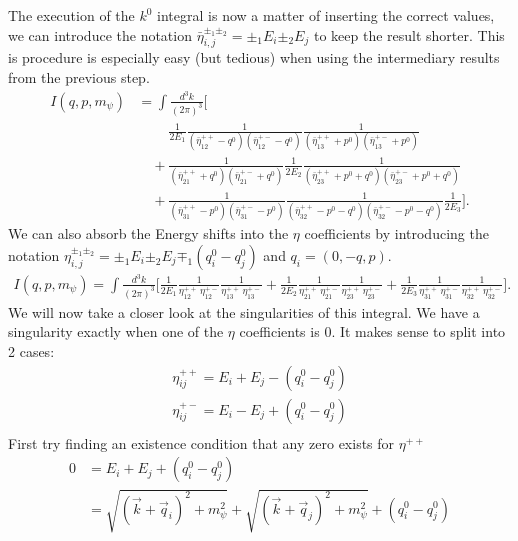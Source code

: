 The execution of the $k^0$ integral is now a matter of inserting the correct values, we can introduce the notation $\bar{\eta}^{\pm_1\pm_2}_{i,j} =\pm_1E_i \pm_2E_j$ to keep the result shorter. This is procedure is especially easy (but tedious) when using the intermediary results from the previous step.
\begin{align*}
    I(q,p,m_\psi)
    &= \int\frac{d^3k}{(2\pi)^3}
    \Bigg[\\
    &\quad \phantom{+} \frac{1}{2E_1}
    \frac{1}{(\bar{\eta}^{++}_{12} - q^0)(\bar{\eta}^{+-}_{12} - q^0)}
    \frac{1}{(\bar{\eta}^{++}_{13} + p^0)(\bar{\eta}^{+-}_{13} + p^0)} \\
    &\quad +
    \frac{1}{(\bar{\eta}^{++}_{21} + q^0)(\bar{\eta}^{+-}_{21} + q^0)}
    \frac{1}{2E_2}
    \frac{1}{(\bar{\eta}^{++}_{23} + p^0 + q^0)(\bar{\eta}^{+-}_{23} + p^0 + q^0)} \\
    &\quad +
    \frac{1}{(\bar{\eta}^{++}_{31} - p^0)(\bar{\eta}^{+-}_{31} - p^0)}
    \frac{1}{(\bar{\eta}^{++}_{32} - p^0 - q^0)(\bar{\eta}^{+-}_{32} - p^0 - q^0)}
    \frac{1}{2E_3}
    \Bigg].
\end{align*}
We can also absorb the Energy shifts into the $\eta$ coefficients by introducing the notation $\eta^{\pm_1\pm_2}_{i,j} =\pm_1E_i \pm_2E_j \mp_1 (q^0_i-q^0_j)$ and $q_i = (0,-q, p)$.
\begin{align*}
    I(q,p,m_\psi)
    = \int\frac{d^3k}{(2\pi)^3}
    \Bigg[
    \frac{1}{2E_1}
    \frac{1}{\eta^{++}_{12}\,\eta^{+-}_{12}}
    \frac{1}{\eta^{++}_{13}\,\eta^{+-}_{13}}
     +
    \frac{1}{2E_2}
    \frac{1}{\eta^{++}_{21}\,\eta^{+-}_{21}}
    \frac{1}{\eta^{++}_{23}\,\eta^{+-}_{23}}
     +
    \frac{1}{2E_3}
    \frac{1}{\eta^{++}_{31}\,\eta^{+-}_{31}}
    \frac{1}{\eta^{++}_{32}\,\eta^{+-}_{32}}
    \Bigg].
\end{align*}
We will now take a closer look at the singularities of this integral. We have a singularity exactly when one of the $\eta$ coefficients is $0$. It makes sense to split into 2 cases:
\begin{align}
    \eta^{++}_{ij} = E_i + E_j - (q^0_i - q^0_j)\\
    \eta^{+-}_{ij} = E_i - E_j + (q^0_i - q^0_j)\\
\end{align}
First try finding an existence condition that any zero exists for $\eta^{++}$
\begin{align}
    0 &= E_i + E_j + (q^0_i - q^0_j)\\
    &= \sqrt{(\vec{k}+\vec{q}_i)^2+m_\psi^2} + \sqrt{(\vec{k}+\vec{q}_j)^2+m_\psi^2} + (q^0_i - q^0_j)\\
\end{align}
